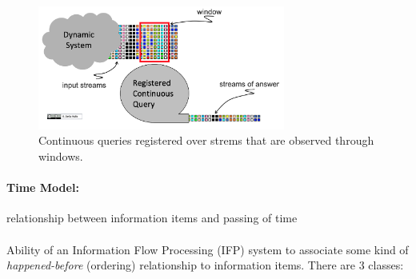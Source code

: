 \documentclass[10pt,a4paper]{article}
\newcommand{\nline}{\\~\\}
\begin{document}
\begin{figure}[ht!]
 \hfill \includegraphics[width=230pt]{images/continuous-semantics.png}\hspace*{\fill}
 \caption{Continuous queries registered over strems that are observed through windows.}
\end{figure} 

\paragraph{Time Model:} relationship between information items and passing of time \nline
Ability of an Information Flow Processing (IFP) system to associate some kind of \textit{happened-before} (ordering) relationship to information items. There are 3 classes:
\end{document}
